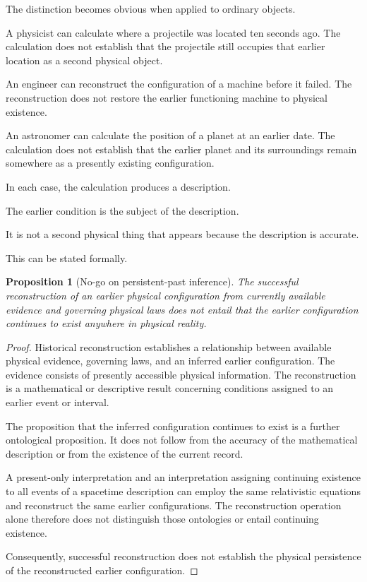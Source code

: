 \documentclass[12pt,onecolumn]{article}
\newtheorem{proposition}{Proposition}[section]
\begin{document}
The distinction becomes obvious when applied to ordinary objects.

A physicist can calculate where a projectile was located ten seconds ago. The calculation does not establish that the projectile still occupies that earlier location as a second physical object.

An engineer can reconstruct the configuration of a machine before it failed. The reconstruction does not restore the earlier functioning machine to physical existence.

An astronomer can calculate the position of a planet at an earlier date. The calculation does not establish that the earlier planet and its surroundings remain somewhere as a presently existing configuration.

In each case, the calculation produces a description.

The earlier condition is the subject of the description.

It is not a second physical thing that appears because the description is accurate.

This can be stated formally.

\begin{proposition}[No-go on persistent-past inference]

The successful reconstruction of an earlier physical configuration from currently available evidence and governing physical laws does not entail that the earlier configuration continues to exist anywhere in physical reality.

\end{proposition}

\begin{proof}

Historical reconstruction establishes a relationship between available physical evidence, governing laws, and an inferred earlier configuration. The evidence consists of presently accessible physical information. The reconstruction is a mathematical or descriptive result concerning conditions assigned to an earlier event or interval.

The proposition that the inferred configuration continues to exist is a further ontological proposition. It does not follow from the accuracy of the mathematical description or from the existence of the current record.

A present-only interpretation and an interpretation assigning continuing existence to all events of a spacetime description can employ the same relativistic equations and reconstruct the same earlier configurations. The reconstruction operation alone therefore does not distinguish those ontologies or entail continuing existence.

Consequently, successful reconstruction does not establish the physical persistence of the reconstructed earlier configuration.

\end{proof}
\end{document}

